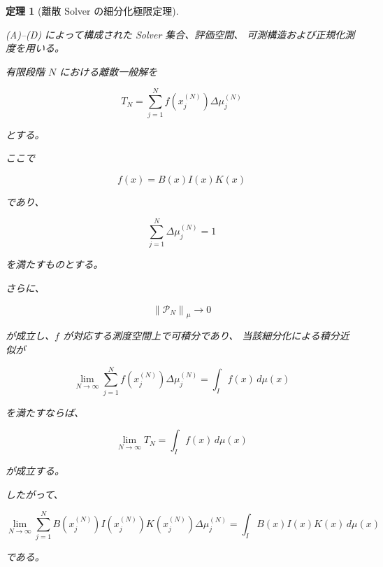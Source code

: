 \documentclass[a4paper,11pt]{article}
\newtheorem{theorem}[definition]{定理}
\begin{document}
\begin{theorem}[離散 Solver の細分化極限定理]
\label{thm:F-discrete-limit}

(A)--(D) によって構成された Solver 集合、評価空間、
可測構造および正規化測度を用いる。

有限段階 $N$ における離散一般解を

\begin{equation}
    T_N
    =
    \sum_{j=1}^{N}
    f\!\left(x_j^{(N)}\right)
    \Delta\mu_j^{(N)}
    \label{eq:F-theorem-discrete}
\end{equation}

とする。

ここで

\begin{equation}
    f(x)
    =
    B(x)I(x)K(x)
    \label{eq:F-theorem-integrand}
\end{equation}

であり、

\begin{equation}
    \sum_{j=1}^{N}
    \Delta\mu_j^{(N)}
    =
    1
\end{equation}

を満たすものとする。

さらに、

\begin{equation}
    \left\|
    \mathcal{P}_N
    \right\|_\mu
    \longrightarrow0
\end{equation}

が成立し、$f$ が対応する測度空間上で可積分であり、
当該細分化による積分近似が

\begin{equation}
    \lim_{N\to\infty}
    \sum_{j=1}^{N}
    f\!\left(x_j^{(N)}\right)
    \Delta\mu_j^{(N)}
    =
    \int_I f(x)\,d\mu(x)
    \label{eq:F-integral-convergence}
\end{equation}

を満たすならば、

\begin{equation}
    \boxed{
        \lim_{N\to\infty}T_N
        =
        \int_I f(x)\,d\mu(x)
    }
    \label{eq:F-limit}
\end{equation}

が成立する。

したがって、

\begin{equation}
    \boxed{
        \lim_{N\to\infty}
        \sum_{j=1}^{N}
        B\!\left(x_j^{(N)}\right)
        I\!\left(x_j^{(N)}\right)
        K\!\left(x_j^{(N)}\right)
        \Delta\mu_j^{(N)}
        =
        \int_I
        B(x)I(x)K(x)\,d\mu(x)
    }
    \label{eq:F-ECA-limit}
\end{equation}

である。
\end{theorem}
\end{document}
